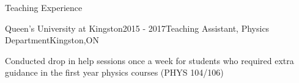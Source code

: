 \documentclass{resume2} %
\begin{document}

\begin{rSection}{Teaching Experience}
	
	\begin{rSubsection}{Queen's University at Kingston}{2015 - 2017}{Teaching Assistant, Physics Department}{Kingston,ON}
		\item Conducted drop in help sessions once a week for students who required extra guidance in the first year physics courses (PHYS 104/106)
	\end{rSubsection}

\end{rSection}

\end{document}
